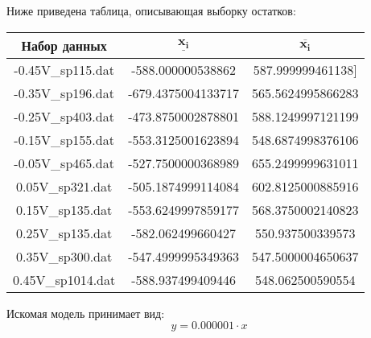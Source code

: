 \documentclass[12pt,a4paper]{article}
\begin{document}
                Ниже приведена таблица, описывающая выборку остатков:
                \begin{center}
                    \begin{tabular}{|c|c|c|}
                    \hline
                        \textbf{Набор данных} & $\mathbf{\underline{x_i}}$ & $\mathbf{\overline{x_i}}$\\
                        \hline
                        -0.45V\_sp115.dat&-588.000000538862&587.999999461138]\\
                        \hline
                        -0.35V\_sp196.dat&-679.4375004133717&565.5624995866283\\
                        \hline
                        -0.25V\_sp403.dat&-473.8750002878801&588.1249997121199\\
                        \hline
                        -0.15V\_sp155.dat&-553.3125001623894&548.6874998376106\\
                        \hline
                        -0.05V\_sp465.dat&-527.7500000368989&655.2499999631011\\
                        \hline
                        0.05V\_sp321.dat &-505.1874999114084&602.8125000885916\\
                        \hline
                        0.15V\_sp135.dat &-553.6249997859177&568.3750002140823\\
                        \hline
                        0.25V\_sp135.dat &-582.062499660427&550.937500339573\\
                        \hline
                        0.35V\_sp300.dat &-547.4999995349363&547.5000004650637\\
                        \hline
                        0.45V\_sp1014.dat&-588.937499409446&548.062500590554\\
                        \hline
                        \hline
                    \end{tabular}
                \end{center}
                Искомая модель принимает вид:
                \begin{equation}
                    y = 0.000001\cdot x
                \end{equation}
               
        \clearpage
	\newpage
\end{document}
